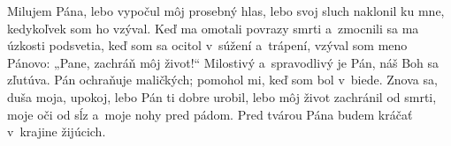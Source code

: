 Milujem Pána, lebo vypočul
môj prosebný hlas,
\versseparator
lebo svoj sluch naklonil ku mne,
kedykoľvek som ho vzýval.
\versseparator
Keď ma omotali povrazy smrti
a~zmocnili sa ma úzkosti podsvetia,
\versseparator
keď som sa ocitol v~súžení a~trápení,
vzýval som meno Pánovo:
\versseparator
„Pane, zachráň môj život!“
Milostivý a~spravodlivý je Pán,
náš Boh sa zľutúva.
\versseparator
Pán ochraňuje maličkých;
pomohol mi, keď som bol v~biede.
\versseparator
Znova sa, duša moja, upokoj,
lebo Pán ti dobre urobil,
\versseparator
lebo môj život zachránil od smrti,
moje oči od sĺz
a~moje nohy pred pádom.
\versseparator
Pred tvárou Pána budem kráčať
v~krajine žijúcich.